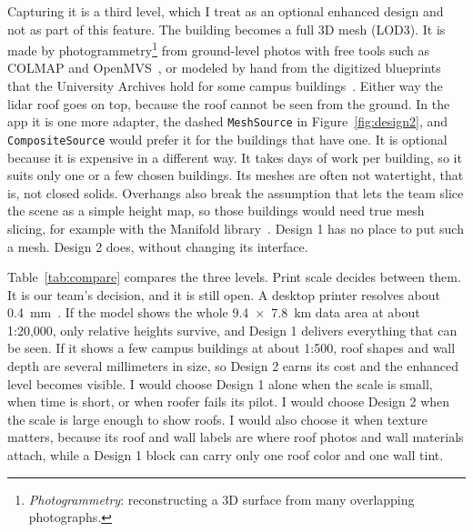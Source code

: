 \documentclass[11pt,letterpaper]{article}
\begin{document}
Capturing it is a third level, which I treat as an optional enhanced design and not as part of this feature. The building becomes a full 3D mesh (LOD3). It is made by photogrammetry\footnote{\emph{Photogrammetry}: reconstructing a 3D surface from many overlapping photographs.} from ground-level photos with free tools such as COLMAP and OpenMVS~\cite{colmap,openmvs}, or modeled by hand from the digitized blueprints that the University Archives hold for some campus buildings~\cite{umedia}. Either way the lidar roof goes on top, because the roof cannot be seen from the ground. In the app it is one more adapter, the dashed \texttt{MeshSource} in Figure~\ref{fig:design2}, and \texttt{CompositeSource} would prefer it for the buildings that have one. It is optional because it is expensive in a different way. It takes days of work per building, so it suits only one or a few chosen buildings. Its meshes are often not watertight, that is, not closed solids. Overhangs also break the assumption that lets the team slice the scene as a simple height map, so those buildings would need true mesh slicing, for example with the Manifold library~\cite{manifold}. Design 1 has no place to put such a mesh. Design 2 does, without changing its interface.

Table~\ref{tab:compare} compares the three levels. Print scale decides between them. It is our team's decision, and it is still open. A desktop printer resolves about 0.4~mm~\cite{touchterrain}. If the model shows the whole 9.4~$\times$~7.8~km data area at about 1:20,000, only relative heights survive, and Design 1 delivers everything that can be seen. If it shows a few campus buildings at about 1:500, roof shapes and wall depth are several millimeters in size, so Design 2 earns its cost and the enhanced level becomes visible. I would choose Design 1 alone when the scale is small, when time is short, or when roofer fails its pilot. I would choose Design 2 when the scale is large enough to show roofs. I would also choose it when texture matters, because its roof and wall labels are where roof photos and wall materials attach, while a Design 1 block can carry only one roof color and one wall tint.
\end{document}
